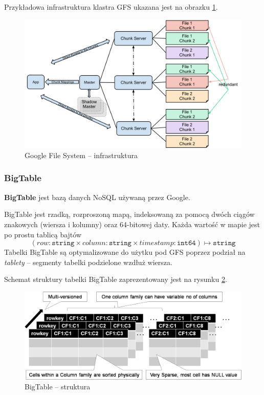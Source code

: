 Przykładowa infrastruktura klastra GFS ukazana jest na obrazku \ref{fig:google:gfs}.

\begin{figure}
    \centering
    \includegraphics[scale=0.2]{obrazki/GoogleFileSystemGFS.png}
    \caption{Google File System -- infrastruktura}
    \label{fig:google:gfs}
\end{figure}

\subsubsection{BigTable}
\label{ssub:bigtable}
\textbf{BigTable} jest bazą danych NoSQL używaną przez Google. 

BigTable jest rzadką, rozproszoną mapą, indeksowaną za pomocą dwóch ciągów znakowych (wiersza i kolumny) oraz 64-bitowej daty. Każda wartość w mapie jest po prostu tablicą bajtów
$$(row: \texttt{string} \times column: \texttt{string} \times timestamp: \texttt{int64}) \mapsto \texttt{string}$$
Tabelki BigTable są optymalizowane do użytku pod GFS poprzez podział na \textit{tablety} -- segmenty tabelki podzielone wzdłuż wiersza.

Schemat struktury tabelki BigTable zaprezentowany jest na rysunku \ref{fig:google:big-table}.

\begin{figure}
    \centering
    \includegraphics[scale=0.5]{obrazki/big-table.png}
    \caption{BigTable -- struktura}
    \label{fig:google:big-table}
\end{figure}

